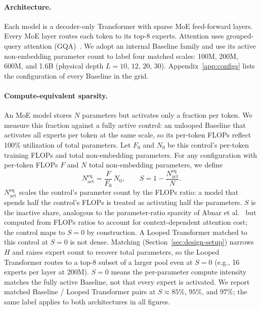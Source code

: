 \documentclass[]{bytedance_seed}
\theoremstyle{definition}
\theoremstyle{remark}
\begin{document}
\paragraph{Architecture.}
Each model is a decoder-only Transformer with sparse MoE feed-forward layers.
%
Every MoE layer routes each token to its top-8 experts.
%
Attention uses grouped-query attention (GQA)~\cite{ainslie2023gqa}.
%
We adopt an internal Baseline family and use its active non-embedding parameter count to label four matched scales: 100M, 200M, 600M, and 1.6B (physical depth $L = 10$, $12$, $20$, $30$).
%
Appendix~\ref{app:configs} lists the configuration of every Baseline in the grid.
%

\paragraph{Compute-equivalent sparsity.}
An MoE model stores $N$ parameters but activates only a fraction per token.
%
We measure this fraction against a fully active control: an unlooped Baseline that activates all experts per token at the same scale, so its per-token FLOPs reflect 100\% utilization of total parameters.
%
Let $F_0$ and $N_0$ be this control's per-token training FLOPs and total non-embedding parameters.
%
For any configuration with per-token FLOPs $F$ and $N$ total non-embedding parameters, we define
%
\begin{equation}
N_{\mathrm{act}}^{\mathrm{eq}} = \frac{F}{F_0}\,N_0,
\qquad
S = 1 - \frac{N_{\mathrm{act}}^{\mathrm{eq}}}{N}.
\label{eq:equivalent-sparsity}
\end{equation}
%
$N_{\mathrm{act}}^{\mathrm{eq}}$ scales the control's parameter count by the FLOPs ratio: a model that spends half the control's FLOPs is treated as activating half the parameters.
%
$S$ is the inactive share, analogous to the parameter-ratio sparsity of Abnar et al.~\cite{abnar2025parameters} but computed from FLOPs ratios to account for context-dependent attention cost; the control maps to $S = 0$ by construction.
%
A Looped Transformer matched to this control at $S = 0$ is not dense.
%
Matching (Section~\ref{sec:design-setup}) narrows $H$ and raises expert count to recover total parameters, so the Looped Transformer routes to a top-8 subset of a larger pool even at $S = 0$ (e.g., 16 experts per layer at 200M).
%
$S = 0$ means the per-parameter compute intensity matches the fully active Baseline, not that every expert is activated.
%
We report matched Baseline / Looped Transformer pairs at $S \approx 85\%$, $95\%$, and $97\%$; the same label applies to both architectures in all figures.
%
\end{document}
